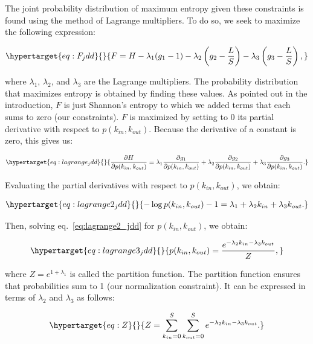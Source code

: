 \documentclass[10pt,oneside]{article}
\begin{document}
The joint probability distribution of maximum entropy given these
constraints is found using the method of Lagrange multipliers. To do so,
we seek to maximize the following expression:

\begin{equation}\protect\hypertarget{eq:F_jdd}{}{F = H - \lambda_1(g_1-1)-\lambda_2\left( g_2-\frac{L}{S}\right) - \lambda_3 \left( g_3-\frac{L}{S}\right),}\label{eq:F_jdd}\end{equation}

where \(\lambda_1\), \(\lambda_2\), and \(\lambda_3\) are the Lagrange
multipliers. The probability distribution that maximizes entropy is
obtained by finding these values. As pointed out in the introduction,
\(F\) is just Shannon's entropy to which we added terms that each sums
to zero (our constraints). \(F\) is maximized by setting to 0 its
partial derivative with respect to \(p(k_{in},k_{out})\). Because the
derivative of a constant is zero, this gives us:

\begin{equation}\protect\hypertarget{eq:lagrange_jdd}{}{\frac{\partial H}{\partial p(k_{in},k_{out})} = \lambda_1 \frac{\partial g_1}{\partial p(k_{in},k_{out})} + \lambda_2 \frac{\partial g_2}{\partial p(k_{in},k_{out})}+ \lambda_3 \frac{\partial g_3}{\partial p(k_{in},k_{out})}.}\label{eq:lagrange_jdd}\end{equation}

Evaluating the partial derivatives with respect to
\(p(k_{in},k_{out})\), we obtain:

\begin{equation}\protect\hypertarget{eq:lagrange2_jdd}{}{-\log p(k_{in},k_{out}) - 1 = \lambda_1 + \lambda_2 k_{in} + \lambda_3 k_{out}.}\label{eq:lagrange2_jdd}\end{equation}

Then, solving eq.~\ref{eq:lagrange2_jdd} for \(p(k_{in},k_{out})\), we
obtain:

\begin{equation}\protect\hypertarget{eq:lagrange3_jdd}{}{p(k_{in},k_{out}) = \frac{e^{-\lambda_2k_{in}-\lambda_3k_{out}}}{Z},}\label{eq:lagrange3_jdd}\end{equation}

where \(Z = e^{1+\lambda_1}\) is called the partition function. The
partition function ensures that probabilities sum to 1 (our
normalization constraint). It can be expressed in terms of \(\lambda_2\)
and \(\lambda_3\) as follows:

\begin{equation}\protect\hypertarget{eq:Z}{}{Z = \sum_{k_{in}=0}^S\sum_{k_{out}=0}^S e^{-\lambda_2k_{in}-\lambda_3k_{out}}.}\label{eq:Z}\end{equation}
\end{document}
